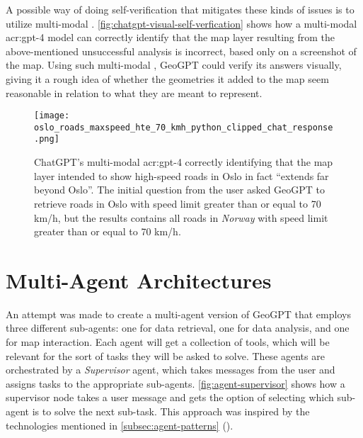 A possible way of doing self-verification that mitigates these kinds of issues is to utilize multi-modal . \autoref{fig:chatgpt-visual-self-verfication} shows how a multi-modal \acrshort{acr:gpt}-4 model can correctly identify that the map layer resulting from the above-mentioned unsuccessful analysis is incorrect, based only on a screenshot of the map. Using such multi-modal , GeoGPT could verify its answers visually, giving it a rough idea of whether the geometries it added to the map seem reasonable in relation to what they are meant to represent.

\begin{figure}
    \centering
    \texttt{[image: oslo\_roads\_maxspeed\_hte\_70\_kmh\_python\_clipped\_chat\_response.png]}
    \caption[Using the multi-modal GPT-4 model to identify errors in an image of a GeoGPT-generated generated road layer]{ChatGPT's multi-modal \acrshort{acr:gpt}-4 correctly identifying that the map layer intended to show high-speed roads in Oslo in fact \enquote{extends far beyond Oslo}. The initial question from the user asked GeoGPT to retrieve roads in Oslo with speed limit greater than or equal to 70 km/h, but the results contains all roads in \textit{Norway} with speed limit greater than or equal to 70 km/h.}
    \label{fig:chatgpt-visual-self-verfication}
\end{figure}

\FloatBarrier

\section{Multi-Agent Architectures}
\label{sec:multi-agent-architectures}

An attempt was made to create a multi-agent version of GeoGPT that employs three different sub-agents: one for data retrieval, one for data analysis, and one for map interaction. Each agent will get a collection of tools, which will be relevant for the sort of tasks they will be asked to solve. These agents are orchestrated by a \textit{Supervisor} agent, which takes messages from the user and assigns tasks to the appropriate sub-agents. \autoref{fig:agent-supervisor} shows how a supervisor node takes a user message and gets the option of selecting which sub-agent is to solve the next sub-task. This approach was inspired by the technologies mentioned in \autoref{subsec:agent-patterns} ().


